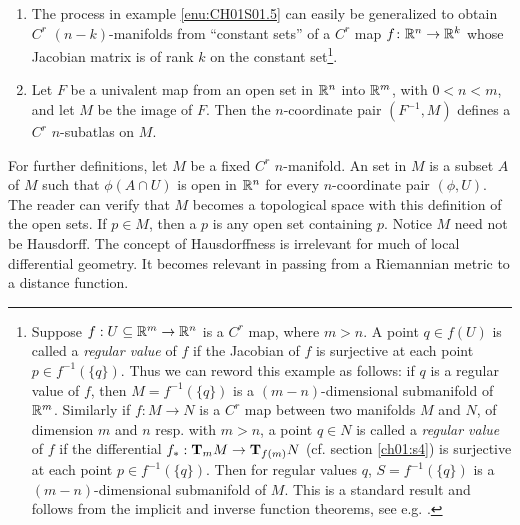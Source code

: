 \documentclass[../main]{subfiles}
\begin{document}
\begin{enumerate}
    \item\label{enu:CH01S01.6} The process in example \ref{enu:CH01S01.5} can easily be generalized to obtain $C^r$ $(n-k)$-manifolds from ``constant sets'' of a $C^r$ map $f\colon\bR^n\functionMaps\bR^k$ whose Jacobian matrix is of rank $k$ on the constant set\footnote{Suppose $f: U\subseteq \bR^m \to \bR^n$ is a $C^r$ map, where $m>n$. A point $q\in f(U)$ is called a \emph{regular value} of $f$ if the Jacobian of $f$ is surjective at each point $p\in f^{-1}(\{q\})$. Thus we can reword this example as follows: if $q$ is a regular value of $f$, then $M=f^{-1}(\{q\})$ is a $(m-n)$-dimensional submanifold of $\bR^m$. Similarly if $f: M\to N$ is a $C^r$ map between two manifolds $M$ and $N$, of dimension $m$ and $n$ resp. with $m>n$, a point $q\in N$ is called a \emph{regular value} of $f$ if the differential $f_*: \tangentspace{M}{m} \to \tangentspace{N}{f(m)}$ (cf. section \ref{ch01:s4}) is surjective at each point $p\in f^{-1}(\{q\})$. Then for regular values $q$, $S=f^{-1}(\{q\})$ is a $(m-n)$-dimensional submanifold of $M$. This is a standard result and follows from the implicit and inverse function theorems, see e.g. \cite[Chapter 1, Theorem 3.2]{hirsch1976differential}.}.
    
    \item\label{enu:CH01S01.7} Let $F$ be a univalent map from an open set in $\bR^n$ into $\bR^m$, with $0 < n< m$, and let $M$ be the image of $F$. Then the $n$-coordinate pair $(F^{-1}, M)$ defines a $C^r$ $n$-subatlas on $M$.
\end{enumerate}

For further definitions, let $M$ be a fixed $C^r$ $n$-manifold. An  set in $M$ is a subset $A$ of $M$ such that $\phi(A\cap U)$ is open in $\bR^n$ for every $n$-coordinate pair $(\phi, U)$. The reader can verify that $M$ becomes a topological space with this definition of the open sets. If $p \in M$, then a  $p$ is any open set containing $p$. Notice $M$ need not be Hausdorff. The concept of Hausdorffness is irrelevant for much of local differential geometry. It becomes relevant in passing from a Riemannian metric to a distance function.
\end{document}
